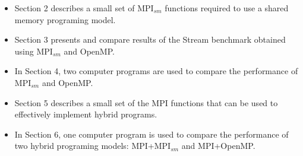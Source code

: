 \begin{itemize} 
\item Section 2 describes a small set of MPI$_{sm}$ functions required to use a shared memory programing model. %

\item Section 3 presents and compare results of the Stream benchmark obtained using MPI$_{sm}$ and OpenMP.

\item In Section 4, two computer programs are used to compare the performance of MPI$_{sm}$ and OpenMP.

\item Section 5 describes a small set of the MPI functions that can be used to effectively implement hybrid programs.

\item In Section 6, one computer program is used to compare the performance of two hybrid programing models: MPI+MPI$_{sm}$ and MPI+OpenMP.


\end{itemize}






